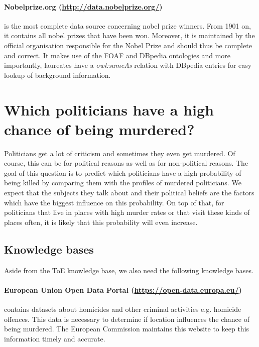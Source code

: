 \documentclass[12pt,a4paper]{article}
\begin{document}
\paragraph{\textbf{Nobelprize.org} (\url{http://data.nobelprize.org/})} is the most complete data source concerning nobel prize winners. From 1901 on, it contains all nobel prizes that have been won. Moreover, it is maintained by the official organisation responsible for the Nobel Prize and should thus be complete and correct. It makes use of the FOAF and DBpedia ontologies and more importantly, laureates have a \emph{owl:sameAs} relation with DBpedia entries for easy lookup of background information.
 

\section{ Which politicians have a high chance of being murdered?}

Politicians get a lot of criticism and sometimes they even get murdered. Of course, this can be for political reasons as well as for non-political reasons. The goal of this question is to predict which politicians have a high probability of being killed by comparing them with the profiles of murdered politicians. We expect that the subjects they talk about and their political beliefs are the factors which have the biggest influence on this probability. On top of that, for politicians that live in places with high murder rates or that visit these kinds of places often, it is likely that this probability will even increase.

\subsection*{Knowledge bases}

Aside from the ToE knowledge base, we also need the following knowledge bases.

\paragraph{\textbf{European Union Open Data Portal} (\url{https://open-data.europa.eu/})} contains datasets about homicides and other criminal activities e.g. homicide offences. This data is necessary to determine if location influences the chance of being murdered. The European Commission maintains this website to keep this information timely and accurate.
\end{document}
